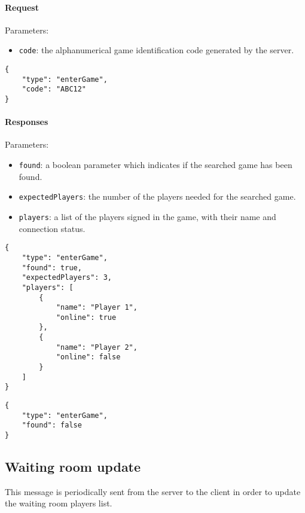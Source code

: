\documentclass[a4paper]{article}
\begin{document}
	\paragraph{Request} Parameters:

	\begin{itemize}
		\item \verb|code|: the alphanumerical game identification code generated by the server.
	\end{itemize}

	\begin{verbatim}
{
	"type": "enterGame",
	"code": "ABC12"
}
	\end{verbatim}

	\paragraph{Responses} Parameters:

	\begin{itemize}
		\item \verb|found|: a boolean parameter which indicates if the searched game has been found.
		\item \verb|expectedPlayers|: the number of the players needed for the searched game.
		\item \verb|players|: a list of the players signed in the game, with their name and connection status.
	\end{itemize}

	\begin{multicols}{2}

	\begin{verbatim}
{
	"type": "enterGame",
	"found": true,
	"expectedPlayers": 3,
	"players": [
		{
			"name": "Player 1",
			"online": true
		},
		{
			"name": "Player 2",
			"online": false
		}
	]
}
		\end{verbatim}

	\begin{verbatim}
{
	"type": "enterGame",
	"found": false
}
		\end{verbatim}

	\end{multicols}

	\subsection{Waiting room update}

	This message is periodically sent from the server to the client in order to update the waiting room players list.
\end{document}
